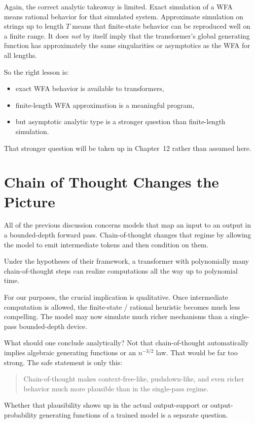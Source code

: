 Again, the correct analytic takeaway is limited. Exact simulation of a WFA means rational behavior for that simulated system. Approximate simulation on strings up to length $T$ means that finite-state behavior can be reproduced well on a finite range. It does \emph{not} by itself imply that the transformer's global generating function has approximately the same singularities or asymptotics as the WFA for all lengths.

So the right lesson is:
\begin{itemize}
  \item exact WFA behavior is available to transformers,
  \item finite-length WFA approximation is a meaningful program,
  \item but asymptotic analytic type is a stronger question than finite-length simulation.
\end{itemize}

That stronger question will be taken up in Chapter~12 rather than assumed here.

\section{Chain of Thought Changes the Picture}

All of the previous discussion concerns models that map an input to an output in a bounded-depth forward pass. Chain-of-thought changes that regime by allowing the model to emit intermediate tokens and then condition on them.

\begin{theorem}
Under the hypotheses of their framework, a transformer with polynomially many chain-of-thought steps can realize computations all the way up to polynomial time.
\end{theorem}

For our purposes, the crucial implication is qualitative. Once intermediate computation is allowed, the finite-state / rational heuristic becomes much less compelling. The model may now simulate much richer mechanisms than a single-pass bounded-depth device.

What should one conclude analytically? Not that chain-of-thought automatically implies algebraic generating functions or an $n^{-3/2}$ law. That would be far too strong. The safe statement is only this:
\begin{quote}
Chain-of-thought makes context-free-like, pushdown-like, and even richer behavior much more plausible than in the single-pass regime.
\end{quote}
Whether that plausibility shows up in the actual output-support or output-probability generating functions of a trained model is a separate question.


